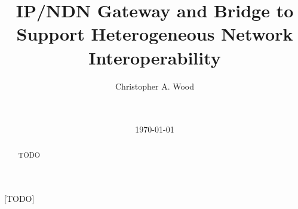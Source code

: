 \documentclass{sigcomm}
\begin{document}
\title{IP/NDN Gateway and Bridge to Support Heterogeneous Network Interoperability}

\author{
\alignauthor
Christopher A. Wood\\
       \\
       \\
}

\date{\today}

\maketitle
\begin{abstract}
TODO
\end{abstract}

[TODO]




% 

% 
% 
% 




\end{document}
